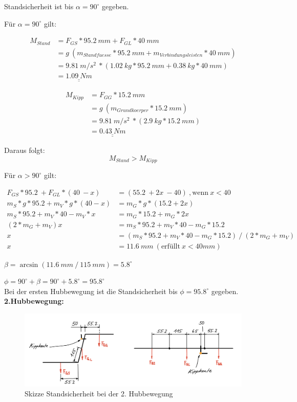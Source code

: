 Standsicherheit ist bis \({\alpha} = 90^\circ\) gegeben.

Für \({\alpha} = 90^\circ\) gilt:


\begin{align*}
    M_{Stand} &= F_{GS} * 95.2\ mm + F_{GL} * 40\ mm \\
    &= g\ (m_{Standfuesse} * 95.2\ mm + m_{Verbindungsleisten} * 40\ mm) \\
    &= 9.81\ m/s^2\ * (1.02\ kg * 95.2\ mm + 0.38\ kg * 40\ mm) \\
    &= \underline{\underline{1.09\ Nm}}
\end{align*}

\begin{align*}
    M_{Kipp} &= F_{GG} * 15.2\ mm \\
    &= g\ (m_{Grundkoerper} * 15.2\ mm) \\
    &= 9.81\ m/s^2\ * (2.9\ kg * 15.2\ mm) \\
    &= \underline{\underline{0.43\ Nm}}
\end{align*}

Daraus folgt:
\[M_{Stand} > M_{Kipp}\]

Für \({\alpha} > 90^\circ\) gilt:

\begin{align*}
    F_{GS} * 95.2\ + F_{GL} * (40\ - x) &= (55.2\ + 2x\ - 40)\ ,\text{wenn}\ x < 40 \\
    m_{S} * g * 95.2 + m_{V} * g * (40 - x) &= m_{G} * g * (15.2 + 2x) \\
    m_{S} * 95.2 + m_{V} * 40 - m_{V} * x &= m_{G} * 15.2 + m_{G} * 2x \\
    (2 * m_{G} + m_{V}) x &= m_{S} * 95.2 + m_{V} * 40 - m_{G} * 15.2 \\
    x &= (m_{S} * 95.2 + m_{V} * 40 - m_{G} * 15.2)\ /\ (2 * m_{G} + m_{V}) \\
    x &= 11.6\ mm\ (\text{erfüllt}\ x < 40 mm)
\end{align*}


\({\beta} = \arcsin{(11.6\ mm\ /\ 115\ mm)} = 5.8^{\circ} \)

\({\phi} = 90^{\circ} + {\beta} = 90^{\circ} + 5.8^{\circ} = 95.8^{\circ} \)\\

Bei der ersten Hubbewegung ist die Standsicherheit bis \({\phi} = 95.8^\circ\) gegeben.
\\


\textbf{2.Hubbewegung:}
\begin{figure}[H]
  \includegraphics[width=1\textwidth]{img/Treppensteigen/Standsicherheit 2.Hub.png}
  \centering
  \caption{Skizze Standsicherheit bei der 2. Hubbewegung}
  \label{fig:standsicherheit-2-hubbewegung}
\end{figure}

